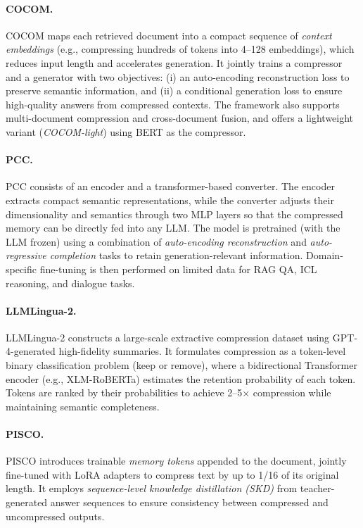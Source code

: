 \documentclass{applemlr}
\numberwithin{equation}{section}
\begin{document}
\paragraph{COCOM. \citep{10.1145/3701551.3703527}}
COCOM maps each retrieved document into a compact sequence of \textit{context embeddings} 
(e.g., compressing hundreds of tokens into 4–128 embeddings), 
which reduces input length and accelerates generation. 
It jointly trains a compressor and a generator with two objectives: 
(i) an auto-encoding reconstruction loss to preserve semantic information, and 
(ii) a conditional generation loss to ensure high-quality answers from compressed contexts. 
The framework also supports multi-document compression and cross-document fusion, 
and offers a lightweight variant (\textit{COCOM-light}) using BERT as the compressor.

\paragraph{PCC. \citep{dai-etal-2025-pretraining}}
PCC consists of an encoder and a transformer-based converter. 
The encoder extracts compact semantic representations, 
while the converter adjusts their dimensionality and semantics through two MLP layers 
so that the compressed memory can be directly fed into any LLM. 
The model is pretrained (with the LLM frozen) using a combination of 
\textit{auto-encoding reconstruction} and \textit{auto-regressive completion} tasks 
to retain generation-relevant information. 
Domain-specific fine-tuning is then performed on limited data for RAG QA, ICL reasoning, and dialogue tasks.

\paragraph{LLMLingua-2. \citep{pan-etal-2024-llmlingua}}
LLMLingua-2 constructs a large-scale extractive compression dataset using GPT-4-generated high-fidelity summaries. 
It formulates compression as a token-level binary classification problem (keep or remove), 
where a bidirectional Transformer encoder (e.g., XLM-RoBERTa) estimates the retention probability of each token. 
Tokens are ranked by their probabilities to achieve 2–5× compression 
while maintaining semantic completeness.

\paragraph{PISCO. \citep{louis-etal-2025-pisco}}
PISCO introduces trainable \textit{memory tokens} appended to the document, 
jointly fine-tuned with LoRA adapters to compress text by up to 1/16 of its original length. 
It employs \textit{sequence-level knowledge distillation (SKD)} from teacher-generated answer sequences 
to ensure consistency between compressed and uncompressed outputs.
\end{document}
